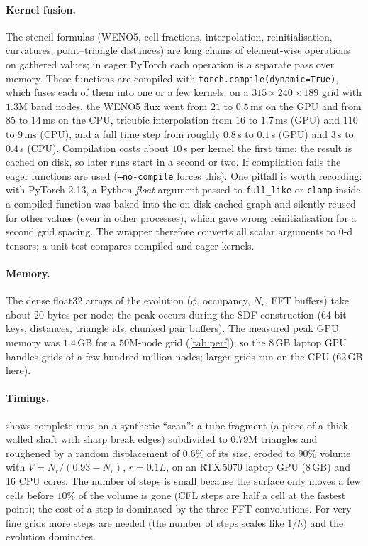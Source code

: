 \documentclass[11pt]{article}
\newcommand{\N}{N_r}
\newcommand{\code}[1]{\texttt{#1}}
\begin{document}
\paragraph{Kernel fusion.} The stencil formulas (WENO5, cell fractions, interpolation, reinitialisation,
curvatures, point--triangle distances) are long chains of element-wise operations on gathered values;
in eager PyTorch each operation is a separate pass over memory. These functions are compiled with
\code{torch.compile(dynamic=True)}, which fuses each of them into one or a few kernels: on a
$315\times240\times189$ grid with $1.3$M band nodes, the WENO5 flux went from $21$ to $0.5$\,ms on the GPU
and from $85$ to $14$\,ms on the CPU, tricubic interpolation from $16$ to $1.7$\,ms (GPU) and $110$ to
$9$\,ms (CPU), and a full time step from roughly $0.8$\,s to $0.1$\,s (GPU) and $3$\,s to $0.4$\,s (CPU).
Compilation costs about $10$\,s per kernel the first time; the result is cached on disk, so later runs
start in a second or two. If compilation fails the eager functions are used (\code{--no-compile} forces
this). One pitfall is worth recording: with PyTorch 2.13, a Python \emph{float} argument passed to
\code{full\_like} or \code{clamp} inside a compiled function was baked into the on-disk cached graph and
silently reused for other values (even in other processes), which gave wrong reinitialisation for a second
grid spacing. The wrapper therefore converts all scalar arguments to 0-d tensors; a unit test compares
compiled and eager kernels.

\paragraph{Memory.} The dense float32 arrays of the evolution ($\phi$, occupancy, $\N$, FFT buffers)
take about $20$ bytes per node; the peak occurs during the SDF construction (64-bit keys, distances,
triangle ids, chunked pair buffers). The measured peak GPU memory was $1.4$\,GB for a $50$M-node grid
(\cref{tab:perf}), so the 8\,GB laptop GPU handles grids of a few hundred million nodes; larger grids
run on the CPU (62\,GB here).

\paragraph{Timings.}  shows complete runs on a synthetic ``scan'': a tube fragment
(a piece of a thick-walled shaft with sharp break edges) subdivided to $0.79$M triangles and roughened by a
random displacement of $0.6\%$ of its size, eroded to $90\%$ volume with $V=\N/(0.93-\N)$, $r=0.1L$, on an
RTX\,5070 laptop GPU (8\,GB) and 16 CPU cores. The number of steps is small because the surface only
moves a few cells before $10\%$ of the volume is gone (CFL steps are half a cell at the fastest point);
the cost of a step is dominated by the three FFT convolutions. For very fine grids more steps are needed
(the number of steps scales like $1/h$) and the evolution dominates.
\end{document}

